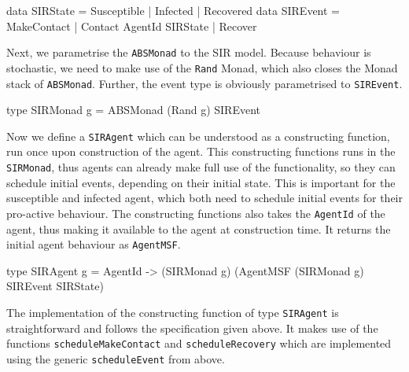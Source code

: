 \begin{HaskellCode}
data SIRState = Susceptible | Infected | Recovered
data SIREvent = MakeContact | Contact AgentId SIRState | Recover 
\end{HaskellCode}

Next, we parametrise the \texttt{ABSMonad} to the SIR model. Because behaviour is stochastic, we need to make use of the \texttt{Rand} Monad, which also closes the Monad stack of \texttt{ABSMonad}. Further, the event type is obviously parametrised to \texttt{SIREvent}.

\begin{HaskellCode}
type SIRMonad g = ABSMonad (Rand g) SIREvent
\end{HaskellCode}

Now we define a \texttt{SIRAgent} which can be understood as a constructing function, run once upon construction of the agent. This constructing functions runs in the \texttt{SIRMonad}, thus agents can already make full use of the functionality, so they can schedule initial events, depending on their initial state. This is important for the susceptible and infected agent, which both need to schedule initial events for their pro-active behaviour. The constructing functions also takes the \texttt{AgentId} of the agent, thus making it available to the agent at construction time. It returns the initial agent behaviour as \texttt{AgentMSF}.

\begin{HaskellCode}
type SIRAgent g 
       = AgentId -> (SIRMonad g) (AgentMSF (SIRMonad g) SIREvent SIRState)
\end{HaskellCode}

The implementation of the constructing function of type \texttt{SIRAgent} is straightforward and follows the specification given above. It makes use of the functions \texttt{scheduleMakeContact} and \texttt{scheduleRecovery} which are implemented using the generic \texttt{scheduleEvent} from above.

